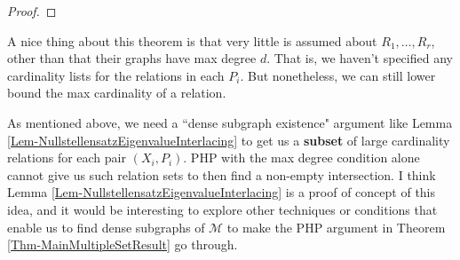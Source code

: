 \documentclass[12pt]{article}
\DeclarePairedDelimiter\ceil{\lceil}{\rceil}
\DeclarePairedDelimiter\floor{\lfloor}{\rfloor}
\theoremstyle{definition}
\begin{document}
\begin{proof}
	\end{proof}
	
	A nice thing about this theorem is that very little is assumed about $R_1,\ldots, R_r$, other than that their graphs have max degree $d$.  That is, we haven't specified any cardinality lists for the relations in each $P_i$.  But nonetheless, we can still lower bound the max cardinality of a relation.  
	
	As mentioned above, we need a ``dense subgraph existence" argument like Lemma \ref{Lem-NullstellensatzEigenvalueInterlacing} to get us a \textbf{subset} of large cardinality relations for each pair $(X_i,P_i)$.  PHP with the max degree condition alone cannot give us such relation sets to then find a non-empty intersection.  I think Lemma \ref{Lem-NullstellensatzEigenvalueInterlacing} is a proof of concept of this idea, and it would be interesting to explore other techniques or conditions that enable us to find dense subgraphs of $\mathcal{M}$ to make the PHP argument in Theorem \ref{Thm-MainMultipleSetResult} go through.
	
\end{document}
